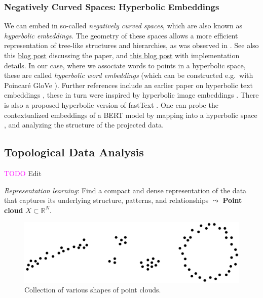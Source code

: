 \documentclass[11pt, a4paper]{amsart}
\begin{document}
\subsubsection{Negatively Curved Spaces: Hyperbolic Embeddings}

We can embed in so-called \emph{negatively curved spaces}, which are also known as \emph{hyperbolic embeddings}.
The geometry of these spaces allows a more efficient representation of tree-like structures and hierarchies, as was observed in \cite{DBLP:journals/corr/NickelK17}.
See also this \href{https://bjlkeng.github.io/posts/hyperbolic-geometry-and-poincare-embeddings/}{blog post} discussing the paper, and \href{https://rare-technologies.com/implementing-poincare-embeddings/}{this blog post} with implementation details.
In our case, where we associate words to points in a hyperbolic space, these are called \emph{hyperbolic word embeddings} (which can be constructed e.g.\ with Poincar{\'e} GloVe \cite{DBLP:journals/corr/abs-1810-06546}).
Further references include an earlier paper on hyperbolic text embeddings \cite{DBLP:journals/corr/abs-1806-04313},
these in turn were inspired by hyperbolic image embeddings \cite{DBLP:journals/corr/abs-1904-02239}.
There is also a proposed hyperbolic version of fastText \cite{zhu-etal-2020-hypertext}.
One can probe the contextualized embeddings of a BERT model by mapping into a hyperbolic space \cite{DBLP:journals/corr/abs-2104-03869}, and analyzing the structure of the projected data.

\subsection{Topological Data Analysis}

\textcolor{magenta}{TODO} Edit

\emph{Representation learning}:
Find a compact and dense representation of the data that captures its underlying structure, patterns, and relationships
$\leadsto$
\textbf{Point cloud} $X \subset \mathbb{R}^{N}$.

\begin{figure}
	\centering
	\includegraphics[width=0.8\linewidth]{figures/topological_data_analysis/topological_data_analysis_collection}
	\caption{
		Collection of various shapes of point clouds.
	}
	\label{fig:topological_data_analysis_collection}
\end{figure}
\end{document}
